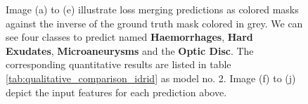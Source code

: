 \begin{figure}[H]
  \caption[Quantitative loss merging analysis for the \ac{IDRID}]{Image (a) to (e) illustrate loss merging predictions as colored masks against the inverse of the ground truth mask colored in grey. We can see four classes to predict named \textbf{\textcolor{rwucyan40}{Haemorrhages}}, \textbf{\textcolor{hardexudates}{Hard Exudates}}, \textbf{\textcolor{microaneurysms}{Microaneurysms}} and the \textbf{\textcolor{rwuviolet}{Optic Disc}}. The corresponding quantitative results are listed in table \ref{tab:qualitative_comparison_idrid} as model no. 2. Image (f) to (j) depict the input features for each prediction above.}
  \label{cedl_idrid_lossCombo}
\end{figure}
